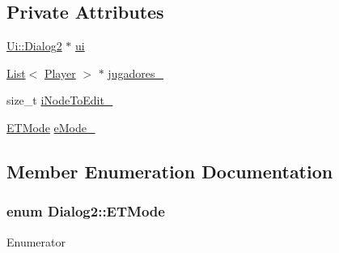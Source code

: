 \subsection*{Private Attributes}
\begin{DoxyCompactItemize}
\item 
\hyperlink{class_ui_1_1_dialog2}{Ui\+::\+Dialog2} $\ast$ \hyperlink{class_dialog2_a321aadfcfc152fc97dc63391f08216fa}{ui}
\item 
\hyperlink{class_list}{List}$<$ \hyperlink{class_player}{Player} $>$ $\ast$ \hyperlink{class_dialog2_a1727e93199b6480451889b6522c626a2}{jugadores\+\_\+}
\item 
size\+\_\+t \hyperlink{class_dialog2_a8fb4a8ae79e9aa259a175b61bef0a977}{i\+Node\+To\+Edit\+\_\+}
\item 
\hyperlink{class_dialog2_a8516d2f5d38e3777d9c6a99c3374159a}{E\+T\+Mode} \hyperlink{class_dialog2_a30d760908a70fc65c73499b96c177d46}{e\+Mode\+\_\+}
\end{DoxyCompactItemize}


\subsection{Member Enumeration Documentation}
\hypertarget{class_dialog2_a8516d2f5d38e3777d9c6a99c3374159a}{}
\subsubsection[{E\+T\+Mode}]{\setlength{\rightskip}{0pt plus 5cm}enum {\bf Dialog2\+::\+E\+T\+Mode}}\label{class_dialog2_a8516d2f5d38e3777d9c6a99c3374159a}
\begin{Desc}
\item[Enumerator]\par
\begin{description}
\item[{\em 
\hypertarget{class_dialog2_a8516d2f5d38e3777d9c6a99c3374159aa99ab8d0aab66b8d569f342432fb3054a}{}A\+D\+D\label{class_dialog2_a8516d2f5d38e3777d9c6a99c3374159aa99ab8d0aab66b8d569f342432fb3054a}
}]\item[{\em 
\hypertarget{class_dialog2_a8516d2f5d38e3777d9c6a99c3374159aa6e55cf4ea362da46b174e49f977628d4}{}E\+D\+I\+T\label{class_dialog2_a8516d2f5d38e3777d9c6a99c3374159aa6e55cf4ea362da46b174e49f977628d4}
}]\item[{\em 
\hypertarget{class_dialog2_a8516d2f5d38e3777d9c6a99c3374159aa9e715c7822a53c88692a844d07be7891}{}S\+E\+A\+R\+C\+H\label{class_dialog2_a8516d2f5d38e3777d9c6a99c3374159aa9e715c7822a53c88692a844d07be7891}
}]\end{description}
\end{Desc}


